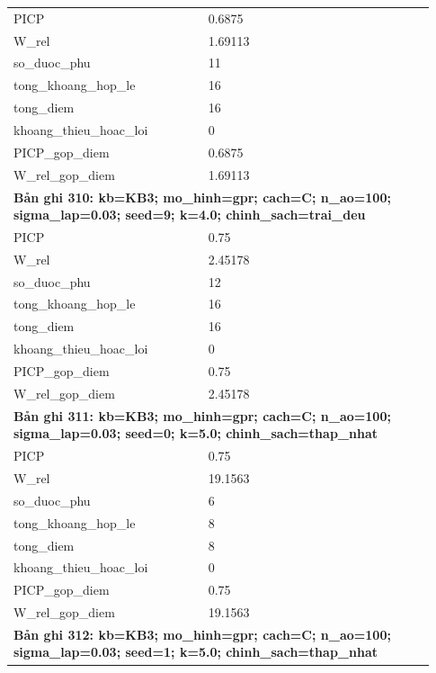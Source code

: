 \begin{longtable}{p{0.43\linewidth}p{0.50\linewidth}}
PICP & 0.6875 \\
W\_\allowbreak rel & 1.69113 \\
so\_\allowbreak duoc\_\allowbreak phu & 11 \\
tong\_\allowbreak khoang\_\allowbreak hop\_\allowbreak le & 16 \\
tong\_\allowbreak diem & 16 \\
khoang\_\allowbreak thieu\_\allowbreak hoac\_\allowbreak loi & 0 \\
PICP\_\allowbreak gop\_\allowbreak diem & 0.6875 \\
W\_\allowbreak rel\_\allowbreak gop\_\allowbreak diem & 1.69113 \\
\midrule
\multicolumn{2}{p{0.95\linewidth}}{\textbf{Bản ghi 310: kb=KB3; mo\_hinh=gpr; cach=C; n\_ao=100; sigma\_lap=0.03; seed=9; k=4.0; chinh\_sach=trai\_deu}} \\
PICP & 0.75 \\
W\_\allowbreak rel & 2.45178 \\
so\_\allowbreak duoc\_\allowbreak phu & 12 \\
tong\_\allowbreak khoang\_\allowbreak hop\_\allowbreak le & 16 \\
tong\_\allowbreak diem & 16 \\
khoang\_\allowbreak thieu\_\allowbreak hoac\_\allowbreak loi & 0 \\
PICP\_\allowbreak gop\_\allowbreak diem & 0.75 \\
W\_\allowbreak rel\_\allowbreak gop\_\allowbreak diem & 2.45178 \\
\midrule
\multicolumn{2}{p{0.95\linewidth}}{\textbf{Bản ghi 311: kb=KB3; mo\_hinh=gpr; cach=C; n\_ao=100; sigma\_lap=0.03; seed=0; k=5.0; chinh\_sach=thap\_nhat}} \\
PICP & 0.75 \\
W\_\allowbreak rel & 19.1563 \\
so\_\allowbreak duoc\_\allowbreak phu & 6 \\
tong\_\allowbreak khoang\_\allowbreak hop\_\allowbreak le & 8 \\
tong\_\allowbreak diem & 8 \\
khoang\_\allowbreak thieu\_\allowbreak hoac\_\allowbreak loi & 0 \\
PICP\_\allowbreak gop\_\allowbreak diem & 0.75 \\
W\_\allowbreak rel\_\allowbreak gop\_\allowbreak diem & 19.1563 \\
\midrule
\multicolumn{2}{p{0.95\linewidth}}{\textbf{Bản ghi 312: kb=KB3; mo\_hinh=gpr; cach=C; n\_ao=100; sigma\_lap=0.03; seed=1; k=5.0; chinh\_sach=thap\_nhat}} \\

\end{longtable}

